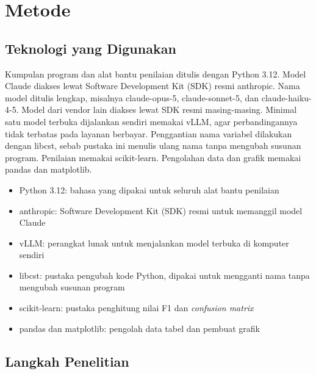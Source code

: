 \documentclass[11pt,a4paper]{article}
\begin{document}
\section{Metode}

\subsection{Teknologi yang Digunakan}

Kumpulan program dan alat bantu penilaian ditulis dengan Python 3.12. Model Claude diakses lewat Software Development Kit (SDK) resmi anthropic. Nama model ditulis lengkap, misalnya claude-opus-5, claude-sonnet-5, dan claude-haiku-4-5. Model dari vendor lain diakses lewat SDK resmi masing-masing. Minimal satu model terbuka dijalankan sendiri memakai vLLM, agar perbandingannya tidak terbatas pada layanan berbayar. Penggantian nama variabel dilakukan dengan libcst, sebab pustaka ini menulis ulang nama tanpa mengubah susunan program. Penilaian memakai scikit-learn. Pengolahan data dan grafik memakai pandas dan matplotlib.

\begin{itemize}[leftmargin=*]
  \item Python 3.12: bahasa yang dipakai untuk seluruh alat bantu penilaian
  \item anthropic: Software Development Kit (SDK) resmi untuk memanggil model Claude
  \item vLLM: perangkat lunak untuk menjalankan model terbuka di komputer sendiri
  \item libcst: pustaka pengubah kode Python, dipakai untuk mengganti nama tanpa mengubah susunan program
  \item scikit-learn: pustaka penghitung nilai F1 dan \textit{confusion matrix}
  \item pandas dan matplotlib: pengolah data tabel dan pembuat grafik
\end{itemize}

\subsection{Langkah Penelitian}
\end{document}
